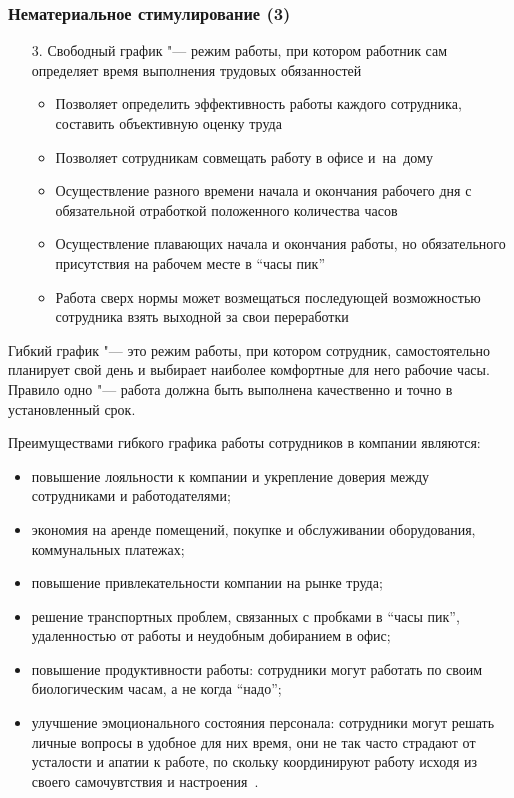 \documentclass{../industrial-development}
\begin{document}
\begin{frame} \frametitle{Нематериальное стимулирование (3)}
	\begin{itemize}
		\item[3.] \alert{Свободный график} "--- режим работы, при котором работник сам определяет время выполнения трудовых обязанностей
		\begin{itemize}
			\item Позволяет определить эффективность работы каждого сотрудника, составить объективную оценку труда
			\item Позволяет сотрудникам совмещать работу в офисе и~на~дому
			\item Осуществление разного времени начала и окончания рабочего дня с обязательной отработкой положенного количества часов
			\item Осуществление плавающих начала и окончания работы, но обязательного присутствия на рабочем месте в “часы пик”
			\item Работа сверх нормы может возмещаться последующей возможностью сотрудника взять выходной за свои переработки
		\end{itemize}
	\end{itemize}
\end{frame}

\lecturenotes

Гибкий график "--- это режим работы, при котором сотрудник, самостоятельно планирует свой день и выбирает наиболее комфортные для него рабочие часы. Правило одно "--- работа должна быть выполнена качественно и точно в установленный срок.

Преимуществами гибкого графика работы сотрудников в компании являются:
\begin{itemize}
	\item повышение лояльности к компании и укрепление доверия между сотрудниками и работодателями;
	\item экономия на аренде помещений, покупке и обслуживании оборудования, коммунальных платежах;
	\item повышение привлекательности компании на рынке труда;
	\item решение транспортных проблем, связанных с пробками в “часы пик”, удаленностью от работы и неудобным добиранием в офис;
	\item повышение продуктивности работы: сотрудники могут работать по своим биологическим часам, а не когда “надо”;
	\item улучшение эмоционального состояния персонала: сотрудники могут решать личные вопросы в удобное для них время, они не так часто страдают от усталости и апатии к работе, по скольку координируют работу исходя из своего самочувтствия и настроения~\cite{Shabarshina}.
\end{itemize}
\end{document}

